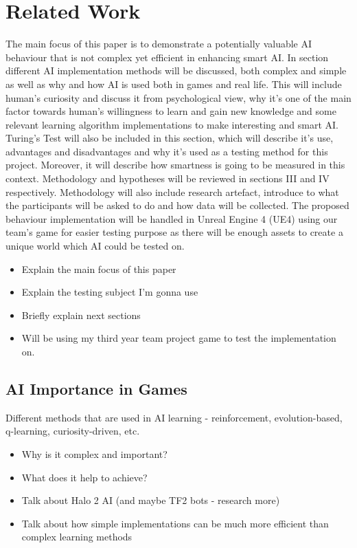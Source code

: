 \documentclass[journal]{IEEEtran}
\begin{document}
\section{Related Work} %
The main focus of this paper is to demonstrate a potentially valuable AI behaviour that is not complex yet efficient in enhancing smart AI. In section different AI implementation methods will be discussed, both complex and simple as well as why and how AI is used both in games and real life. This will include human's curiosity and discuss it from psychological view, why it's one of the main factor towards human's willingness to learn and gain new knowledge and some relevant learning algorithm implementations to make interesting and smart AI. Turing's Test will also be included in this section, which will describe it's use, advantages and disadvantages and why it's used as a testing method for this project. Moreover, it will describe how smartness is going to be measured in this context. Methodology and hypotheses will be reviewed in sections III and IV respectively. Methodology will also include research artefact, introduce to what the participants will be asked to do and how data will be collected. The proposed behaviour implementation will be handled in Unreal Engine 4 (UE4) using our team's game for easier testing purpose as there will be enough assets to create a unique world which AI could be tested on.
\begin{itemize}
	\item Explain the main focus of this paper
	\item Explain the testing subject I'm gonna use
	\item Briefly explain next sections
	\item Will be using my third year team project game to test the implementation on.
\end{itemize}

\subsection{AI Importance in Games}
Different methods that are used in AI learning - reinforcement, evolution-based, q-learning, curiosity-driven, etc. 
\begin{itemize}
	\item Why is it complex and important?
	\item What does it help to achieve? 
	\item Talk about Halo 2 AI (and maybe TF2 bots - research more)
	\item Talk about how simple implementations can be much more efficient than complex learning methods
\end{itemize}
\end{document}
